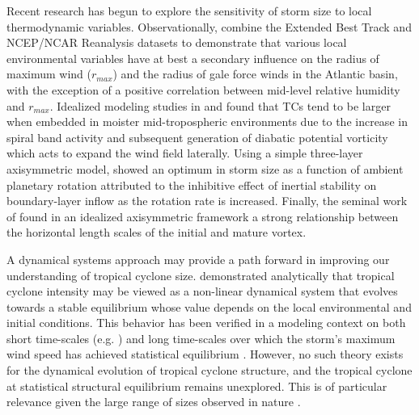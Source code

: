 \documentclass[12pt]{article}
\begin{document}
Recent research has begun to explore the sensitivity of storm size to local thermodynamic variables. Observationally, \cite{Quiring_Schumacher_Labosier_Zhu_2011} combine the Extended Best Track and NCEP/NCAR Reanalysis datasets to demonstrate that various local environmental variables have at best a secondary influence on the radius of maximum wind ($r_{max}$) and the radius of gale force winds in the Atlantic basin, with the exception of a positive correlation between mid-level relative humidity and $r_{max}$.  Idealized modeling studies in \cite{Hill_Lackmann_2009} and \cite{Xu_Wang_2010} found that TCs tend to be larger when embedded in moister mid-tropospheric environments due to the increase in spiral band activity and subsequent generation of diabatic potential vorticity which acts to expand the wind field laterally. Using a simple three-layer axisymmetric model, \cite{Smith_Schmidt_Montgomery_2011} showed an optimum in storm size as a function of ambient planetary rotation attributed to the inhibitive effect of inertial stability on boundary-layer inflow as the rotation rate is increased.  Finally, the seminal work of \cite{Rotunno_Emanuel_1987} found in an idealized axisymmetric framework a strong relationship between the horizontal length scales of the initial and mature vortex.

A dynamical systems approach may provide a path forward in improving our understanding of tropical cyclone size. \cite{Tang_Emanuel_2010} demonstrated analytically that tropical cyclone intensity may be viewed as a non-linear dynamical system that evolves towards a stable equilibrium whose value depends on the local environmental and initial conditions. This behavior has been verified in a modeling context on both short time-scales (e.g. \cite{Rotunno_Emanuel_1987}) and long time-scales over which the storm's maximum wind speed has achieved statistical equilibrium \citep{Hakim_2011}.  However, no such theory exists for the dynamical evolution of tropical cyclone structure, and the tropical cyclone at statistical structural equilibrium remains unexplored. This is of particular relevance given the large range of sizes observed in nature \citep{Chavas_Emanuel_2010}.
\end{document}
